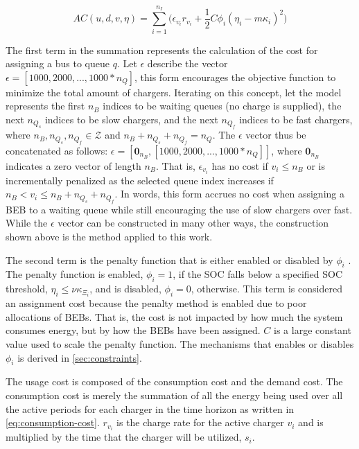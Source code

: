 \documentclass[11pt,a4paper,final]{article}
\newcommand{\AC}{AC(u, d, v, \eta)}         %
\begin{document}
\begin{equation}
\label{eq:ac}
\AC = \sum_{i=1}^{n_I} \Big(\epsilon_{v_i}r_{v_i} + \frac{1}{2} C \phi_i (\eta_i - m \kappa_i)^{2}\Big)
\end{equation}

The first term in the summation represents the calculation of the cost for assigning a bus to queue \(q\). Let \(\epsilon\)
describe the vector \(\epsilon = [1000, 2000, ..., 1000*n_Q]\), this form encourages the objective function to minimize the total
amount of chargers. Iterating on this concept, let the model represents the first \(n_B\) indices to be waiting queues (no
charge is supplied), the next \(n_{Q_s}\) indices to be slow chargers, and the next \(n_{Q_f}\) indices to be fast chargers,
where \(n_B, n_{Q_s}, n_{Q_f} \in \mathcal{Z}\) and \(n_B + n_{Q_s} + n_{Q_f} = n_Q\). The \(\epsilon\) vector thus be concatenated as follows:
\(\epsilon = [\mathbf{0}_{n_B}, [1000, 2000, ..., 1000*n_Q]]\), where \(\mathbf{0}_{n_B}\) indicates a zero vector of length \(n_B\).
That is, \(\epsilon_{v_i}\) has no cost if \(v_i \le n_B\) or is incrementally penalized as the selected queue index increases if
\(n_B < v_i \le n_B + n_{Q_s} + n_{Q_f}\). In words, this form accrues no cost when assigning a BEB to a waiting queue while
still encouraging the use of slow chargers over fast. While the \(\epsilon\) vector can be constructed in many other ways, the
construction shown above is the method applied to this work.

The second term is the penalty function that is either enabled or disabled by \(\phi_i\)
\cite{luenberger-2008-penal-barrier-method}. The penalty function is enabled, \(\phi_i = 1\), if the SOC falls below a
specified SOC threshold, \(\eta_i \le \nu \kappa_{\Xi_i}\), and is disabled, \(\phi_i = 0\), otherwise. This term is considered an assignment
cost because the penalty method is enabled due to poor allocations of BEBs. That is, the cost is not impacted by how
much the system consumes energy, but by how the BEBs have been assigned. \(C\) is a large constant value used to scale the
penalty function. The mechanisms that enables or disables \(\phi_i\) is derived in \ref{sec:constraints}.

The usage cost is composed of the consumption cost and the demand cost. The consumption cost is merely the summation of
all the energy being used over all the active periods for each charger in the time horizon as written in
\ref{eq:consumption-cost}. \(r_{v_i}\) is the charge rate for the active charger \(v_i\) and is multiplied by the time that the
charger will be utilized, \(s_i\).
\end{document}
